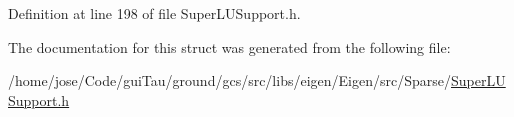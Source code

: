 Definition at line 198 of file Super\-L\-U\-Support.\-h.



The documentation for this struct was generated from the following file\-:\begin{DoxyCompactItemize}
\item 
/home/jose/\-Code/gui\-Tau/ground/gcs/src/libs/eigen/\-Eigen/src/\-Sparse/\hyperlink{_super_l_u_support_8h}{Super\-L\-U\-Support.\-h}\end{DoxyCompactItemize}
